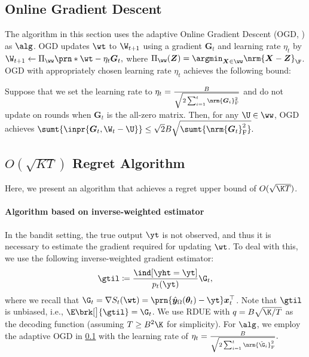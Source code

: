\subsection{Online Gradient Descent}\label{subsec:ogd}
The algorithm in this section uses the adaptive Online Gradient Descent (OGD, \citealt{streeter2010regretonlineconditioning}) as $\alg$.
OGD updates $\wt$ to $\W_{t+1}$ using a gradient $\bm{G}_t$ and learning rate $\eta_t$ by
$
    \W_{t+1} \leftarrow \Pi_{\ww} \prn*{\wt - \eta_{t} \bm{G}_t},
$
where $\Pi_{\ww}(\bm Z) = \argmin_{\bm{X} \in \ww} \nrm{\bm X - \bm Z}_{\F}$.
OGD with appropriately chosen learning rate $\eta_t$ achieves the following bound:
\begin{lemma}
    \label{lem:ogd}
    Suppose that we set the learning rate to $\eta_t=\frac{B}{\sqrt{2 \sum_{i=1}^t\nrm{\bm{G}_i}_{\mathrm{F}}^2}}$ and do not update on rounds when $\bm{G}_t$ is the all-zero matrix.
    Then, for any $\U\in\ww$, OGD achieves 
    $
        \sumt{\inpr{\bm{G}_t, \W_t - \U}}
        \leq \sqrt{2}B\sqrt{\sumt{\nrm{\bm{G}_t}_{\mathrm{F}}^2}}.
    $
\end{lemma}

\subsection{$O(\sqrt{K T})$ Regret Algorithm}
\label{subsec:Bandit_Structured_Prediction_with_General_Losses}
Here, we present an algorithm that achieves a regret upper bound of $O(\sqrt{\K T})$.
\paragraph{Algorithm based on inverse-weighted estimator}
In the bandit setting, the true output $\yt$ is not observed,  
and thus it is necessary to estimate the gradient required for updating $\wt$.  
To deal with this, we use the following inverse-weighted gradient estimator:
\begin{equation}\label{eq:inverse_weighted_est}
    \gtil\coloneqq\frac{\ind[\yht=\yt]}{p_t(\yt)}\G_t,
\end{equation}
where we recall that $\G_t=\nabla S_t(\wt) = \prn{\hat{\bm{y}}_\Omega(\bm{\theta}_t) - \yt} \bm{x}_t^\top$.
Note that $\gtil$ is unbiased, i.e., $\E\brk[\big]{\gtil}=\G_t$.
We use RDUE with $q=B\sqrt{\K/T}$ as the decoding function (assuming $T \geq B^2 \K$ for simplicity).  
For $\alg$, we employ the adaptive OGD in \cref{subsec:ogd} with the learning rate of
$
\eta_t=\frac{B}{\sqrt{2 \sum_{i=1}^t\nrm{\tilde{\G}_i}_{\mathrm{F}}^2}}.
$


